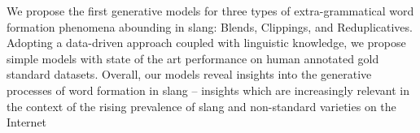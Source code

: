We propose the first generative models for three types of extra-grammatical word formation phenomena abounding in slang: Blends, Clippings, and Reduplicatives. Adopting a data-driven approach coupled with linguistic knowledge, we propose simple models with state of the art performance on human annotated gold standard datasets. Overall, our models reveal insights into the generative processes of word formation in slang -- insights which are increasingly relevant in the context of the rising prevalence of slang and non-standard varieties on the Internet
